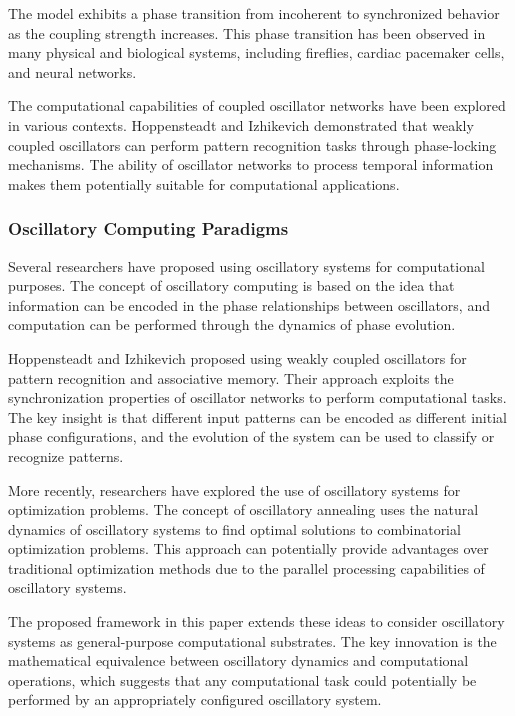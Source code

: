 \documentclass[12pt,a4paper]{article}
\theoremstyle{definition}
\begin{document}
{The model exhibits a phase transition from incoherent to synchronized behavior as the coupling strength increases. This phase transition has been observed in many physical and biological systems, including fireflies, cardiac pacemaker cells, and neural networks.

The computational capabilities of coupled oscillator networks have been explored in various contexts. Hoppensteadt and Izhikevich \cite{hoppensteadt2000pattern} demonstrated that weakly coupled oscillators can perform pattern recognition tasks through phase-locking mechanisms. The ability of oscillator networks to process temporal information makes them potentially suitable for computational applications.

\subsubsection{Oscillatory Computing Paradigms}

Several researchers have proposed using oscillatory systems for computational purposes. The concept of oscillatory computing is based on the idea that information can be encoded in the phase relationships between oscillators, and computation can be performed through the dynamics of phase evolution.

Hoppensteadt and Izhikevich \cite{hoppensteadt2000pattern} proposed using weakly coupled oscillators for pattern recognition and associative memory. Their approach exploits the synchronization properties of oscillator networks to perform computational tasks. The key insight is that different input patterns can be encoded as different initial phase configurations, and the evolution of the system can be used to classify or recognize patterns.

More recently, researchers have explored the use of oscillatory systems for optimization problems. The concept of oscillatory annealing \cite{wang2013oscillatory} uses the natural dynamics of oscillatory systems to find optimal solutions to combinatorial optimization problems. This approach can potentially provide advantages over traditional optimization methods due to the parallel processing capabilities of oscillatory systems.

The proposed framework in this paper extends these ideas to consider oscillatory systems as general-purpose computational substrates. The key innovation is the mathematical equivalence between oscillatory dynamics and computational operations, which suggests that any computational task could potentially be performed by an appropriately configured oscillatory system.

}
\end{document}
